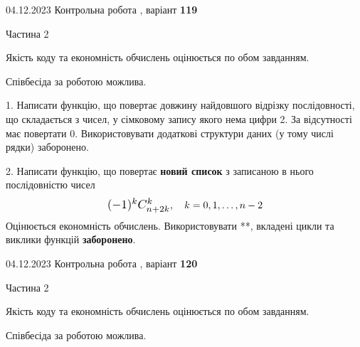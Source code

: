 \documentclass[12pt, ukrainian]{article}
\begin{document}
{{{{{{{{{{{{{{{{{{%



\begin {Huge}
{{04.12.2023 Контрольна робота , варіант  \No \textbf { 119 }\par}}

\begin{center}Частина 2
\end{center}
\vspace{10mm}
\end {Huge}

{
\begin {Large}
Якість коду та економність обчислень оцінюється по обом завданням.

Співбесіда за роботою можлива.

\vspace{5mm}

1. Написати функцію, що повертає довжину найдовшого відрізку послідовності, що складається з чисел, у сімковому запису якого нема цифри 2. За відсутності має повертати $0$. Використовувати додаткові структури даних (у тому числі рядки) заборонено.

\vspace{10mm}



2. 
Написати функцію, що повертає \textbf{новий список} з записаною в нього послідовністю чисел
$$\scalebox{1.2}{$(-1)^{k}C_{n+2k}^{k}$}, \quad k=0,1,\ldots,n-2$$
Оцінюється економність обчислень. Використовувати **, вкладені цикли та виклики функцій \textbf{заборонено}.

\end{Large}\newpage




\begin {Huge}
{{04.12.2023 Контрольна робота , варіант  \No \textbf { 120 }\par}}

\begin{center}Частина 2
\end{center}
\vspace{10mm}
\end {Huge}

{
\begin {Large}
Якість коду та економність обчислень оцінюється по обом завданням.

Співбесіда за роботою можлива.

\vspace{5mm}


\end{Large}}}}}}}}}}}}}}}}}}}}}
\end{document}
